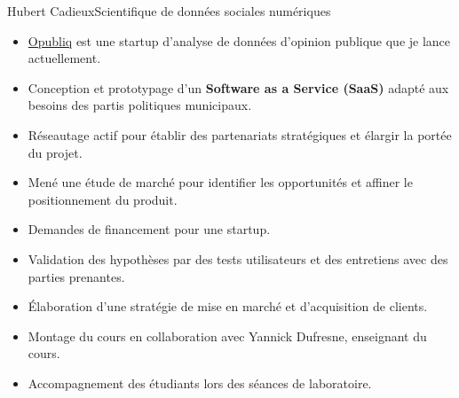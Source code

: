\documentclass{article}
\begin{document}
\begin{cv}[avatar]{Hubert Cadieux}{Scientifique de données sociales numériques}

\begin{cvevent}[2024][présent]
    \cvdescription{}
    \begin{itemize}
        \item \href{https://opubliq.com/}{Opubliq} est une startup d'analyse de données d'opinion publique que je lance actuellement.
        \item Conception et prototypage d'un \textbf{Software as a Service (SaaS)} adapté aux besoins des partis politiques municipaux.
        \item Réseautage actif pour établir des partenariats stratégiques et élargir la portée du projet.
        \item Mené une étude de marché pour identifier les opportunités et affiner le positionnement du produit.
        \item Demandes de financement pour une startup.
        \item Validation des hypothèses par des tests utilisateurs et des entretiens avec des parties prenantes.
        \item Élaboration d'une stratégie de mise en marché et d'acquisition de clients.\\[10pt]
    \end{itemize}
\end{cvevent}

\begin{cvevent}[Juillet 2025]
    \begin{itemize}
        \item Montage du cours en collaboration avec Yannick Dufresne, enseignant du cours.
        \item Accompagnement des étudiants lors des séances de laboratoire.\\[10pt]
    \end{itemize}
\end{cvevent}


\end{cv}
\end{document}
